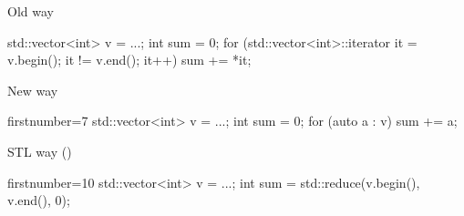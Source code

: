 \begin{frame}[fragile]
  \begin{block}{Old way}
    \begin{cppcode*}{}
      std::vector<int> v = ...;
      int sum = 0;
      for (std::vector<int>::iterator it = v.begin();
           it != v.end(); it++) {
        sum += *it;
      }
    \end{cppcode*}
  \end{block}
  \pause
  \begin{block}{New way}
    \begin{cppcode*}{firstnumber=7}
      std::vector<int> v = ...;
      int sum = 0;
      for (auto a : v) { sum += a; }
    \end{cppcode*}
  \end{block}
  \pause
  \begin{exampleblock}{STL way ()}
    \begin{cppcode*}{firstnumber=10}
      std::vector<int> v = ...;
      int sum = std::reduce(v.begin(), v.end(), 0);
    \end{cppcode*}
  \end{exampleblock}
\end{frame}
